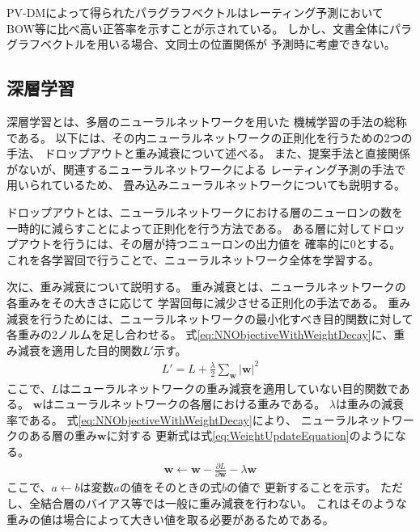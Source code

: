 PV-DMによって得られたパラグラフベクトルはレーティング予測において
BOW等に比べ高い正答率を示すことが示されている。
しかし、文書全体にパラグラフベクトルを用いる場合、文同士の位置関係が
予測時に考慮できない。


\subsection{深層学習}

深層学習とは、多層のニューラルネットワークを用いた
機械学習の手法の総称である\cite{takayuki15}。
以下には、その内ニューラルネットワークの正則化を行うための2つの手法、
ドロップアウトと重み減衰について述べる。
また、提案手法と直接関係がないが、関連するニューラルネットワークによる
レーティング予測の手法\cite{nal14,rie14,duyu15}で用いられているため、
畳み込みニューラルネットワークについても説明する。

ドロップアウトとは、ニューラルネットワークにおける層のニューロンの数を
一時的に減らすことによって正則化を行う方法である。
ある層に対してドロップアウトを行うには、その層が持つニューロンの出力値を
確率的に0とする。
これを各学習回で行うことで、ニューラルネットワーク全体を学習する。

次に、重み減衰について説明する。
重み減衰とは、ニューラルネットワークの各重みをその大きさに応じて
学習回毎に減少させる正則化の手法である。
重み減衰を行うためには、ニューラルネットワークの最小化すべき目的関数に対して
各重みの2ノルムを足し合わせる。
式\ref{eq:NNObjectiveWithWeightDecay}に、重み減衰を適用した目的関数$L'$示す。
\begin{gather} \label{eq:NNObjectiveWithWeightDecay}
  L' = L + \frac{\lambda}{2} \sum_{\mathbf{w}} {|\mathbf{w}|}^2
\end{gather}
ここで、$L$はニューラルネットワークの重み減衰を適用していない目的関数である。
$\mathbf{w}$はニューラルネットワークの各層における重みである。
$\lambda$は重みの減衰率である。
式\ref{eq:NNObjectiveWithWeightDecay}により、
ニューラルネットワークのある層の重み$\mathbf{w}$に対する
更新式は式\ref{eq:WeightUpdateEquation}のようになる。
\begin{gather} \label{eq:WeightUpdateEquation}
  \mathbf{w} \leftarrow \mathbf{w} - \frac{\partial L}{\partial \mathbf{w}}
                                   - \lambda \mathbf{w}
\end{gather}
ここで、$a \leftarrow b$は変数$a$の値をそのときの式$b$の値で
更新することを示す。
ただし、全結合層のバイアス等では一般に重み減衰を行わない。
これはそのような重みの値は場合によって大きい値を取る必要があるためである。

